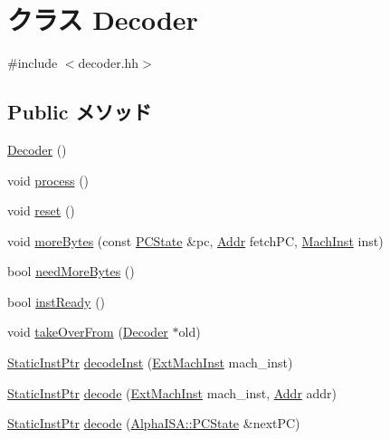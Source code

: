 \hypertarget{classAlphaISA_1_1Decoder}{
\section{クラス Decoder}
\label{classAlphaISA_1_1Decoder}
}


{\ttfamily \#include $<$decoder.hh$>$}\subsection*{Public メソッド}
\begin{DoxyCompactItemize}
\item 
\hyperlink{classAlphaISA_1_1Decoder_aedfa2b7d97ed17b14903ed75d6214c78}{Decoder} ()
\item 
void \hyperlink{classAlphaISA_1_1Decoder_a2e9c5136d19b1a95fc427e0852deab5c}{process} ()
\item 
void \hyperlink{classAlphaISA_1_1Decoder_ad20897c5c8bd47f5d4005989bead0e55}{reset} ()
\item 
void \hyperlink{classAlphaISA_1_1Decoder_a85a99c8dd9425508bee9a17836dbbd12}{moreBytes} (const \hyperlink{classGenericISA_1_1SimplePCState}{PCState} \&pc, \hyperlink{classm5_1_1params_1_1Addr}{Addr} fetchPC, \hyperlink{namespaceAlphaISA_a301c22ea09fa33dcfe6ddf22f203699c}{MachInst} inst)
\item 
bool \hyperlink{classAlphaISA_1_1Decoder_a35631c47fc45b69ca30e6551f9f5d1d1}{needMoreBytes} ()
\item 
bool \hyperlink{classAlphaISA_1_1Decoder_a9f6a0bc8946ca58d5d59a5dbc6a3181f}{instReady} ()
\item 
void \hyperlink{classAlphaISA_1_1Decoder_a83393f90e7cbd98eda9721ba6022d0e0}{takeOverFrom} (\hyperlink{classAlphaISA_1_1Decoder}{Decoder} $\ast$old)
\item 
\hyperlink{classRefCountingPtr}{StaticInstPtr} \hyperlink{classAlphaISA_1_1Decoder_a148768e0e9062eb41f604040d0ea86e6}{decodeInst} (\hyperlink{namespaceAlphaISA_aec686c38e40c7f794f1435591c15c275}{ExtMachInst} mach\_\-inst)
\item 
\hyperlink{classRefCountingPtr}{StaticInstPtr} \hyperlink{classAlphaISA_1_1Decoder_a4ed948f8d08575cc2916fe32154ea69d}{decode} (\hyperlink{namespaceAlphaISA_aec686c38e40c7f794f1435591c15c275}{ExtMachInst} mach\_\-inst, \hyperlink{classm5_1_1params_1_1Addr}{Addr} addr)
\item 
\hyperlink{classRefCountingPtr}{StaticInstPtr} \hyperlink{classAlphaISA_1_1Decoder_a2091be56e44739383015a4ef7347dc7a}{decode} (\hyperlink{classGenericISA_1_1SimplePCState}{AlphaISA::PCState} \&nextPC)
\end{DoxyCompactItemize}
